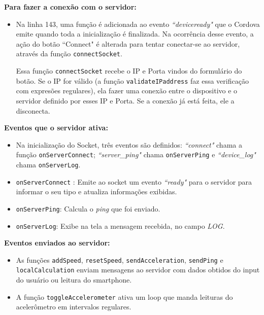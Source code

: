 \documentclass[a4paper,12pt]{article}
\newcommand{\code}[1]{\lstinline[mathescape=true, columns=fixed, basicstyle={\small\ttfamily}]{#1}}
\begin{document}
\textbf{Para fazer a conexão com o servidor:}

\begin{itemize}
  \item Na linha 143, uma função é adicionada ao evento \emph{“deviceready"} que o Cordova emite quando toda a inicialização é finalizada. Na ocorrência desse evento, a ação do botão “Connect" é alterada para tentar conectar-se ao servidor, através da função \code{connectSocket}.

Essa função \code{connectSocket} recebe o IP e Porta vindos do formulário do botão. Se o IP for válido (a função \code{validateIPaddress} faz essa verificação com expresões regulares), ela fazer uma conexão entre o dispositivo e o servidor definido por esses IP e Porta. Se a conexão já está feita, ele a disconecta.
\end{itemize}

\textbf{Eventos que o servidor ativa:}
\begin{itemize}
  \item Na inicialização do Socket, três eventos são definidos: \emph{“connect"} chama a função \code{onServerConnect}; \emph{“server\_ping"} chama \code{onServerPing} e  \emph{“device\_log"} chama \code{onServerLog}.

  \item \code{onServerConnect} : Emite ao socket um evento \emph{“ready"} para o servidor para informar o seu tipo e atualiza informações exibidas.

  \item \code{onServerPing}: Calcula o \emph{ping} que foi enviado.

  \item \code{onServerLog}: Exibe na tela a mensagem recebida, no campo \emph{LOG}.
\end{itemize}


\textbf{Eventos enviados ao servidor:}
\begin{itemize}
  \item As funções \code{addSpeed}, \code{resetSpeed}, \code{sendAcceleration}, \code{sendPing} e \code{localCalculation} enviam mensagens ao servidor com dados obtidos do input do usuário ou leitura do smartphone.

  \item A função \code{toggleAccelerometer} ativa um loop que manda leituras do acelerômetro em intervalos regulares.
\end{itemize}



\newpage
\end{document}

